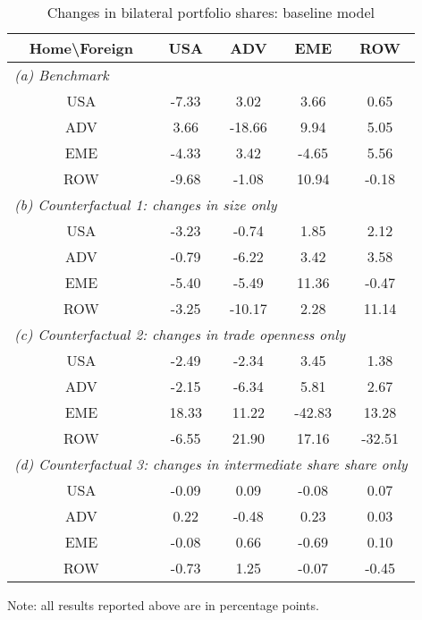 \begin{table}[p]
\renewcommand{\arraystretch}{1.2}
\begin{center}
\begin{threeparttable}
\caption{Changes in bilateral portfolio shares: baseline model}
\label{tab:results-bal-weights}
\begin{tabular}{ccccc}
\toprule
Home\textbackslash Foreign&\multicolumn{1}{p{1.5cm}}{\centering USA}&\multicolumn{1}{p{1.5cm}}{\centering ADV}&\multicolumn{1}{p{1.5cm}}{\centering EME}&\multicolumn{1}{p{1.5cm}}{\centering ROW}\\
\midrule
\multicolumn{5}{l}{\textit{(a) Benchmark}}\\
USA&-7.33&3.02&3.66&0.65\\
ADV&3.66&-18.66&9.94&5.05\\
EME&-4.33&3.42&-4.65&5.56\\
ROW&-9.68&-1.08&10.94&-0.18\\
\midrule
\multicolumn{5}{l}{\textit{(b) Counterfactual 1: changes in size only}}\\
USA&-3.23&-0.74&1.85&2.12\\
ADV&-0.79&-6.22&3.42&3.58\\
EME&-5.40&-5.49&11.36&-0.47\\
ROW&-3.25&-10.17&2.28&11.14\\
\midrule
\multicolumn{5}{l}{\textit{(c) Counterfactual 2: changes in trade openness only}}\\
USA&-2.49&-2.34&3.45&1.38\\
ADV&-2.15&-6.34&5.81&2.67\\
EME&18.33&11.22&-42.83&13.28\\
ROW&-6.55&21.90&17.16&-32.51\\
\midrule
\multicolumn{5}{l}{\textit{(d) Counterfactual 3: changes in intermediate share share only}}\\
USA&-0.09&0.09&-0.08&0.07\\
ADV&0.22&-0.48&0.23&0.03\\
EME&-0.08&0.66&-0.69&0.10\\
ROW&-0.73&1.25&-0.07&-0.45\\
\bottomrule
\end{tabular}
\normalsize
\begin{tablenotes}
\small
\item Note: all results reported above are in percentage points.
\normalsize
\end{tablenotes}
\end{threeparttable}
\end{center}
\end{table}
